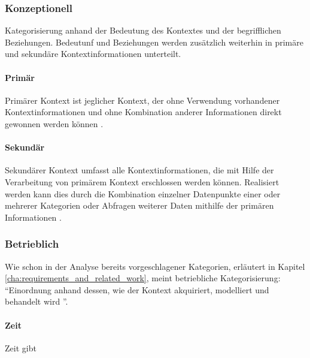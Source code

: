 \subsubsection{Konzeptionell}
Kategorisierung anhand der Bedeutung des Kontextes und der begrifflichen Beziehungen. Bedeutunf und Beziehungen werden zusätzlich weiterhin in primäre und sekundäre Kontextinformationen unterteilt.
\paragraph{Primär}
Primärer Kontext ist jeglicher Kontext, der ohne Verwendung vorhandener Kontextinformationen und ohne Kombination anderer Informationen direkt gewonnen werden können \cite{abowd_towards_1999}. 
\paragraph{Sekundär}
Sekundärer Kontext umfasst alle Kontextinformationen, die mit Hilfe der Verarbeitung von primärem Kontext erschlossen werden können. Realisiert werden kann dies durch die Kombination einzelner Datenpunkte einer oder mehrerer Kategorien oder Abfragen weiterer Daten mithilfe der primären Informationen  \cite{abowd_towards_1999}.
\subsubsection{Betrieblich}
Wie schon in der Analyse bereits vorgeschlagener Kategorien, erläutert in Kapitel \ref{cha:requirements_and_related_work}, meint betriebliche Kategorisierung: ``Einordnung anhand dessen, wie der Kontext akquiriert, modelliert und behandelt wird ''\cite{van2005context}.
\paragraph{Zeit}
Zeit gibt
